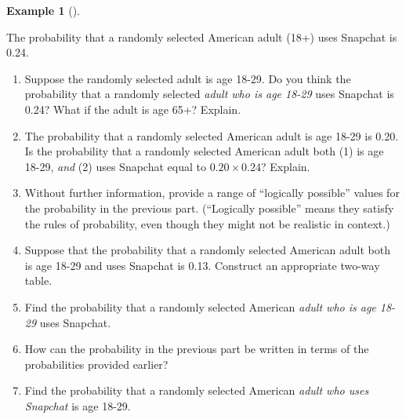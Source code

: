 \documentclass[
  letterpaper,
  DIV=11,
  numbers=noendperiod]{scrreprt}
\providecommand{\tightlist}{%
  \setlength{\itemsep}{0pt}\setlength{\parskip}{0pt}}
\theoremstyle{plain}
\theoremstyle{definition}
\newtheorem{example}{Example}[chapter]
\theoremstyle{definition}
\theoremstyle{definition}
\theoremstyle{remark}
\begin{document}
\begin{tcolorbox}[enhanced jigsaw, opacityback=0, left=2mm, colframe=quarto-callout-note-color-frame, toprule=.15mm, breakable, colback=white, leftrule=.75mm, arc=.35mm, rightrule=.15mm, bottomrule=.15mm]

\begin{example}[]\protect\hypertarget{exm-conditional-probability-def}{}\label{exm-conditional-probability-def}

The probability\footnotemark{} that a randomly selected American adult
(18+) uses Snapchat is 0.24.

\begin{enumerate}
\def\labelenumi{\arabic{enumi}.}
\tightlist
\item
  Suppose the randomly selected adult is age 18-29. Do you think the
  probability that a randomly selected \emph{adult who is age 18-29}
  uses Snapchat is 0.24? What if the adult is age 65+? Explain.
\item
  The probability\footnotemark{} that a randomly selected American adult
  is age 18-29 is 0.20. Is the probability that a randomly selected
  American adult both (1) is age 18-29, \emph{and} (2) uses Snapchat
  equal to \(0.20\times 0.24\)? Explain.
\item
  Without further information, provide a range of ``logically possible''
  values for the probability in the previous part. (``Logically
  possible'' means they satisfy the rules of probability, even though
  they might not be realistic in context.)
\item
  Suppose that the probability that a randomly selected American adult
  both is age 18-29 and uses Snapchat is 0.13. Construct an appropriate
  two-way table.
\item
  Find the probability that a randomly selected American \emph{adult who
  is age 18-29} uses Snapchat.
\item
  How can the probability in the previous part be written in terms of
  the probabilities provided earlier?
\item
  Find the probability that a randomly selected American \emph{adult who
  uses Snapchat} is age 18-29.
\end{enumerate}

\end{example}

\end{tcolorbox}

\end{document}
